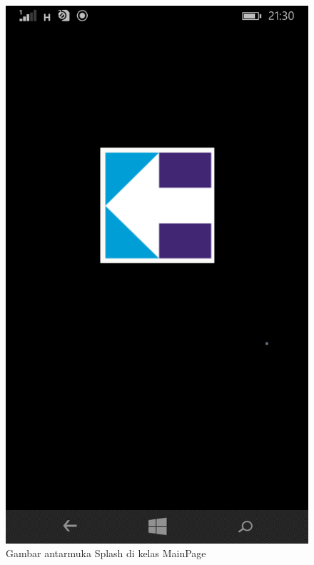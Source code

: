 	\begin{figure}[!h]
		\centering
			\includegraphics[scale=0.2]{Gambar/antarmuka/splash}
		\caption{Gambar antarmuka Splash di kelas MainPage}
		\label{fig:antarmuka splash MainPage}
	\end{figure}	
	
